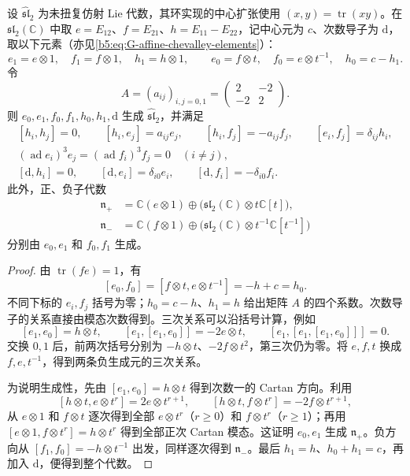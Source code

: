\begin{proposition}\label{b5:prop:G-affine-sl2-generators}
	设 \(\widehat{\mathfrak{sl}}_2\) 为未扭复仿射 Lie 代数，其环实现的中心扩张使用 \((x,y)=\operatorname{tr}(xy)\)。在 \(\mathfrak{sl}_2(\mathbb C)\) 中取 \(e=E_{12}\)、\(f=E_{21}\)、\(h=E_{11}-E_{22}\)，记中心元为 \(c\)、次数导子为 \(\mathrm d\)，取以下元素（亦见\eqref{b5:eq:G-affine-chevalley-elements}）：
	\[
		e_1=e\otimes1,\quad f_1=f\otimes1,\quad h_1=h\otimes1,
		\qquad e_0=f\otimes t,\quad f_0=e\otimes t^{-1},\quad h_0=c-h_1.
	\]
	令
	\[
		A=(a_{ij})_{i,j=0,1}=\begin{pmatrix}2&-2\\-2&2\end{pmatrix}.
	\]
	则 \(e_0,e_1,f_0,f_1,h_0,h_1,\mathrm d\) 生成 \(\widehat{\mathfrak{sl}}_2\)，并满足
	\[
		\begin{gathered}
			[h_i,h_j]=0,\qquad [h_i,e_j]=a_{ij}e_j,\qquad
			[h_i,f_j]=-a_{ij}f_j,\qquad [e_i,f_j]=\delta_{ij}h_i,\\
			(\operatorname{ad}e_i)^3e_j=(\operatorname{ad}f_i)^3f_j=0
			\quad(i\ne j),\\
			[\mathrm d,h_i]=0,\qquad [\mathrm d,e_i]=\delta_{i0}e_i,
			\qquad [\mathrm d,f_i]=-\delta_{i0}f_i.
		\end{gathered}
	\]
	此外，正、负子代数
	\[
		\begin{aligned}
			\mathfrak n_+&=\mathbb C(e\otimes1)\oplus
			\bigl(\mathfrak{sl}_2(\mathbb C)\otimes t\mathbb C[t]\bigr),\\
			\mathfrak n_-&=\mathbb C(f\otimes1)\oplus
			\bigl(\mathfrak{sl}_2(\mathbb C)\otimes t^{-1}\mathbb C[t^{-1}]\bigr)
		\end{aligned}
	\]
	分别由 \(e_0,e_1\) 和 \(f_0,f_1\) 生成。
\end{proposition}
\begin{proof}
	由 \(\operatorname{tr}(fe)=1\)，有
	\[
		[e_0,f_0]=[f\otimes t,e\otimes t^{-1}]=-h+c=h_0.
	\]
	不同下标的 \(e_i,f_j\) 括号为零；\(h_0=c-h\)、\(h_1=h\) 给出矩阵 \(A\) 的四个系数。次数导子的关系直接由模态次数得到。三次关系可以沿括号计算，例如
	\[
		[e_1,e_0]=h\otimes t,\qquad
		[e_1,[e_1,e_0]]=-2e\otimes t,\qquad
		[e_1,[e_1,[e_1,e_0]]]=0.
	\]
	交换 \(0,1\) 后，前两次括号分别为 \(-h\otimes t\)、\(-2f\otimes t^2\)，第三次仍为零。将 \(e,f,t\) 换成 \(f,e,t^{-1}\)，得到两条负生成元的三次关系。

	为说明生成性，先由 \([e_1,e_0]=h\otimes t\) 得到次数一的 Cartan 方向。利用
	\[
		[h\otimes t,e\otimes t^r]=2e\otimes t^{r+1},\qquad
		[h\otimes t,f\otimes t^r]=-2f\otimes t^{r+1},
	\]
	从 \(e\otimes1\) 和 \(f\otimes t\) 逐次得到全部 \(e\otimes t^r\)（\(r\ge0\)）和 \(f\otimes t^r\)（\(r\ge1\)）；再用 \([e\otimes1,f\otimes t^r]=h\otimes t^r\) 得到全部正次 Cartan 模态。这证明 \(e_0,e_1\) 生成 \(\mathfrak n_+\)。负方向从 \([f_1,f_0]=-h\otimes t^{-1}\) 出发，同样逐次得到 \(\mathfrak n_-\)。最后 \(h_1=h\)、\(h_0+h_1=c\)，再加入 \(\mathrm d\)，便得到整个代数。
\end{proof}

